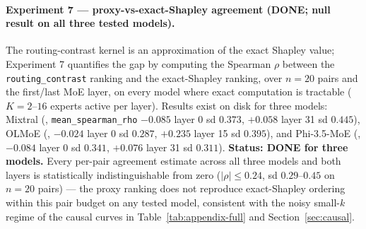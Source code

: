 \documentclass[sigconf]{acmart}
\begin{document}
\paragraph{Experiment 7 --- proxy-vs-exact-Shapley agreement (DONE;
null result on all three tested models).}
The routing-contrast kernel is an approximation of the exact Shapley value;
Experiment 7 quantifies the gap by computing the Spearman $\rho$ between the
\texttt{routing\_contrast} ranking and the exact-Shapley ranking, over
$n{=}20$ pairs and the first/last MoE layer, on every model where exact
computation is tractable ($K{=}2$--$16$ experts active per layer). Results
exist on disk for three models: Mixtral
(, \texttt{mean\_spearman\_rho}
$-0.085$ layer 0 sd $0.373$, $+0.058$ layer 31 sd $0.445$), OLMoE
(, $-0.024$ layer 0 sd $0.287$, $+0.235$
layer 15 sd $0.395$), and Phi-3.5-MoE
(, $-0.084$ layer 0 sd $0.341$, $+0.076$
layer 31 sd $0.311$). \textbf{Status: DONE for three models.} Every
per-pair agreement estimate across all three models and both layers is
statistically indistinguishable from zero ($|\rho| \le 0.24$, sd
$0.29$--$0.45$ on $n{=}20$ pairs) --- the proxy ranking does not
reproduce exact-Shapley ordering within this pair budget on any tested
model, consistent with the noisy small-$k$ regime of the causal curves in
Table~\ref{tab:appendix-full} and Section~\ref{sec:causal}.
\end{document}
